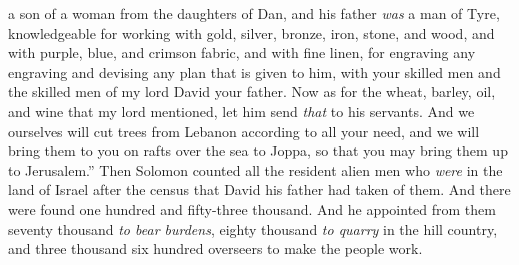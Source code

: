\begin{biblechapter}
\verse a son of a woman from the daughters of Dan, and his father \textit{was} a man of Tyre, knowledgeable for working with gold, silver, bronze, iron, stone, and wood, and with purple, blue, and crimson fabric, and with fine linen, for engraving any engraving and devising any plan that is given to him, with your skilled men and the skilled men of my lord David your father.
\verse Now as for the wheat, barley, oil, and wine that my lord mentioned, let him send \textit{that} to his servants.
\verse And we ourselves will cut trees from Lebanon according to all your need, and we will bring them to you on rafts over the sea to Joppa, so that you may bring them up to Jerusalem.”
\verse Then Solomon counted all the resident alien men who \textit{were} in the land of Israel after the census that David his father had taken of them. And there were found one hundred and fifty-three thousand.
\verse And he appointed from them seventy thousand \textit{to bear burdens}, eighty thousand \textit{to quarry} in the hill country, and three thousand six hundred overseers to make the people work.
\end{biblechapter}

